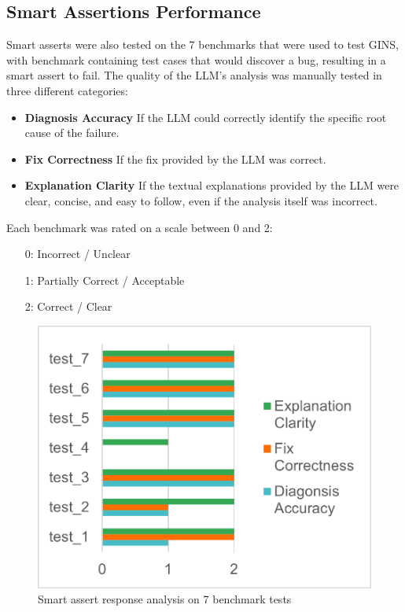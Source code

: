 \documentclass[sigconf,nonacm]{acmart}
\begin{document}
\subsection{Smart Assertions Performance}
Smart asserts were also tested on the 7 benchmarks that were used to test GINS, with benchmark containing test cases that would discover a bug, resulting in a smart assert to fail.
The quality of the LLM's analysis was manually tested in three different categories:

\begin{itemize}
    \item \textbf{Diagnosis Accuracy} If the LLM could correctly identify the specific root cause of the failure.
    \item \textbf{Fix Correctness} If the fix provided by the LLM was correct.
    \item \textbf{Explanation Clarity} If the textual explanations provided by the LLM were clear, concise, and easy to follow, even if the analysis itself was incorrect.
\end{itemize}

Each benchmark was rated on a scale between 0 and 2:

\begin{itemize}
    \item[0:] Incorrect / Unclear 
    \item[1:] Partially Correct / Acceptable
    \item[2:] Correct / Clear
\end{itemize}

\begin{figure}
    \centering
    \includegraphics[width=0.8\linewidth]{images/smartAssert.png}
    \caption{Smart assert response analysis on 7 benchmark tests}
    \label{fig:smartAssert}
\end{figure}
\end{document}
